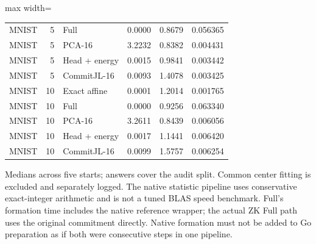 \begin{table}[tp]
\begin{adjustbox}{max width=\textwidth}
\begin{tabular}{@{}lr l rrr@{}}
MNIST & 5 & Full & 0.0000 & 0.8679 & 0.056365 \\
MNIST & 5 & PCA-16 & 3.2232 & 0.8382 & 0.004431 \\
MNIST & 5 & Head + energy & 0.0015 & 0.9841 & 0.003442 \\
MNIST & 5 & CommitJL-16 & 0.0093 & 1.4078 & 0.003425 \\
MNIST & 10 & Exact affine & 0.0001 & 1.2014 & 0.001765 \\
MNIST & 10 & Full & 0.0000 & 0.9256 & 0.063340 \\
MNIST & 10 & PCA-16 & 3.2611 & 0.8439 & 0.006056 \\
MNIST & 10 & Head + energy & 0.0017 & 1.1441 & 0.006420 \\
MNIST & 10 & CommitJL-16 & 0.0099 & 1.5757 & 0.006254 \\
\bottomrule
\end{tabular}
\end{adjustbox}
\par\vspace{3pt}\begin{minipage}{0.98\textwidth}\footnotesize Medians across five starts; answers cover the audit split. Common center fitting is excluded and separately logged. The native statistic pipeline uses conservative exact-integer arithmetic and is not a tuned BLAS speed benchmark. Full's formation time includes the native reference wrapper; the actual ZK Full path uses the original commitment directly. Native formation must not be added to Go preparation as if both were consecutive steps in one pipeline.\end{minipage}
\end{table}
